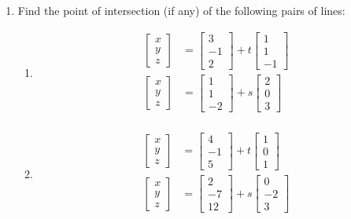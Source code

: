 \documentclass[letterpaper,12pt]{article}
\begin{document}
\begin{enumerate}
\item Find the point of intersection (if any) of the following pairs of lines:
\begin{enumerate}
 \item \begin{align*}
        \begin{bmatrix}x\\y\\z\end{bmatrix} & = \begin{bmatrix}3\\-1\\2\end{bmatrix}+t\begin{bmatrix}1\\1\\-1\end{bmatrix}\\
        \begin{bmatrix}x\\y\\z\end{bmatrix} & = \begin{bmatrix}1\\1\\-2\end{bmatrix}+s\begin{bmatrix}2\\0\\3\end{bmatrix}\\
       \end{align*}
\item \begin{align*}
        \begin{bmatrix}x\\y\\z\end{bmatrix} & = \begin{bmatrix}4\\-1\\5\end{bmatrix}+t\begin{bmatrix}1\\0\\1\end{bmatrix}\\
        \begin{bmatrix}x\\y\\z\end{bmatrix} & = \begin{bmatrix}2\\-7\\12\end{bmatrix}+s\begin{bmatrix}0\\-2\\3\end{bmatrix}\\
       \end{align*}


\end{enumerate}
\end{enumerate}
\end{document}
